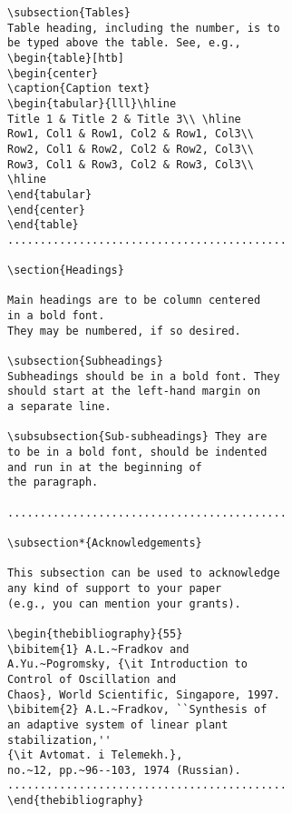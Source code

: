 \begin{verbatim}
\subsection{Tables}
Table heading, including the number, is to
be typed above the table. See, e.g.,
\begin{table}[htb]
\begin{center}
\caption{Caption text}
\begin{tabular}{lll}\hline
Title 1 & Title 2 & Title 3\\ \hline
Row1, Col1 & Row1, Col2 & Row1, Col3\\
Row2, Col1 & Row2, Col2 & Row2, Col3\\
Row3, Col1 & Row3, Col2 & Row3, Col3\\
\hline
\end{tabular}
\end{center}
\end{table}
...........................................

\section{Headings}

Main headings are to be column centered
in a bold font.
They may be numbered, if so desired.

\subsection{Subheadings}
Subheadings should be in a bold font. They
should start at the left-hand margin on
a separate line.

\subsubsection{Sub-subheadings} They are
to be in a bold font, should be indented
and run in at the beginning of
the paragraph.

...........................................

\subsection*{Acknowledgements}

This subsection can be used to acknowledge
any kind of support to your paper
(e.g., you can mention your grants).

\begin{thebibliography}{55}
\bibitem{1} A.L.~Fradkov and
A.Yu.~Pogromsky, {\it Introduction to
Control of Oscillation and
Chaos}, World Scientific, Singapore, 1997.
\bibitem{2} A.L.~Fradkov, ``Synthesis of
an adaptive system of linear plant
stabilization,''
{\it Avtomat. i Telemekh.},
no.~12, pp.~96--103, 1974 (Russian).
...........................................
\end{thebibliography}
\end{verbatim}




